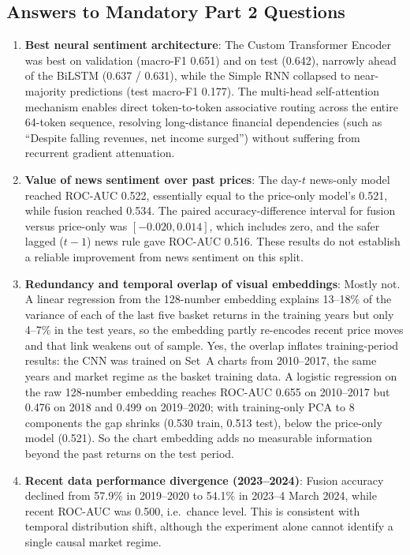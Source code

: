\documentclass[10pt,journal]{IEEEtran}
\begin{document}
\subsection{Answers to Mandatory Part 2 Questions}
\begin{enumerate}
  \item \textbf{Best neural sentiment architecture}:
  The Custom Transformer Encoder was best on validation (macro-F1 0.651) and on test (0.642), narrowly ahead of the BiLSTM (0.637 / 0.631), while the Simple RNN collapsed to near-majority predictions (test macro-F1 0.177). The multi-head self-attention mechanism enables direct token-to-token associative routing across the entire 64-token sequence, resolving long-distance financial dependencies (such as ``Despite falling revenues, net income surged'') without suffering from recurrent gradient attenuation.
  
  \item \textbf{Value of news sentiment over past prices}:
  The day-$t$ news-only model reached ROC-AUC 0.522, essentially equal to the price-only model's 0.521, while fusion reached 0.534. The paired accuracy-difference interval for fusion versus price-only was $[-0.020, 0.014]$, which includes zero, and the safer lagged ($t-1$) news rule gave ROC-AUC 0.516. These results do not establish a reliable improvement from news sentiment on this split.
  
  \item \textbf{Redundancy and temporal overlap of visual embeddings}:
  Mostly not. A linear regression from the 128-number embedding explains 13--18\% of the variance of each of the last five basket returns in the training years but only 4--7\% in the test years, so the embedding partly re-encodes recent price moves and that link weakens out of sample. Yes, the overlap inflates training-period results: the CNN was trained on Set~A charts from 2010--2017, the same years and market regime as the basket training data. A logistic regression on the raw 128-number embedding reaches ROC-AUC 0.655 on 2010--2017 but 0.476 on 2018 and 0.499 on 2019--2020; with training-only PCA to 8 components the gap shrinks (0.530 train, 0.513 test), below the price-only model (0.521). So the chart embedding adds no measurable information beyond the past returns on the test period.

  \item \textbf{Recent data performance divergence (2023--2024)}:
  Fusion accuracy declined from 57.9\% in 2019--2020 to 54.1\% in 2023--4 March 2024, while recent ROC-AUC was 0.500, i.e.\ chance level. This is consistent with temporal distribution shift, although the experiment alone cannot identify a single causal market regime.
  

\end{enumerate}
\end{document}
